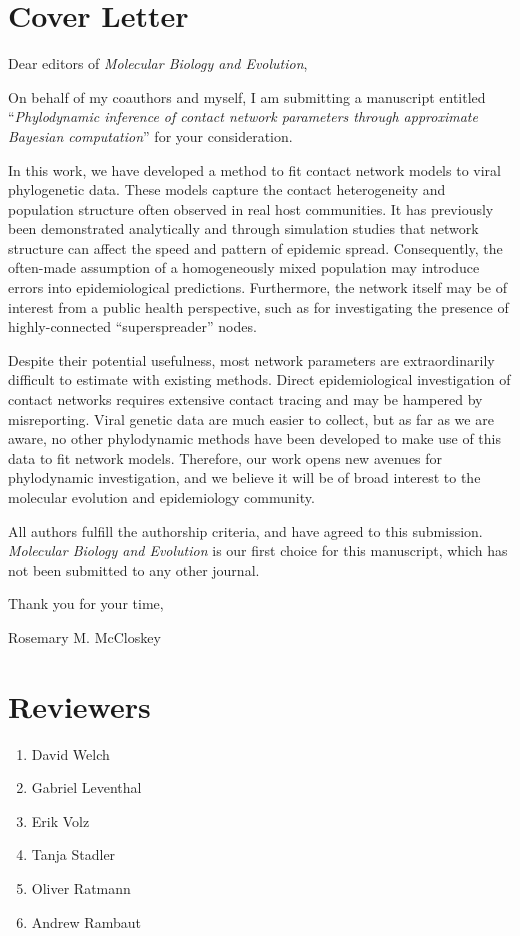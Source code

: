 \documentclass[12pt]{article}
\begin{document}
\section{Cover Letter}

Dear editors of \textit{Molecular Biology and Evolution},

On behalf of my coauthors and myself, I am submitting a manuscript entitled
``\textit{Phylodynamic inference of contact network parameters through
approximate Bayesian computation}'' for your consideration. 

In this work, we have developed a method to fit contact network models to viral
phylogenetic data. These models capture the contact heterogeneity and
population structure often observed in real host communities. It has previously
been demonstrated analytically and through simulation studies that network
structure can affect the speed and pattern of epidemic spread. Consequently,
the often-made assumption of a homogeneously mixed population may introduce
errors into epidemiological predictions. Furthermore, the network itself may be
of interest from a public health perspective, such as for investigating the
presence of highly-connected ``superspreader'' nodes.

Despite their potential usefulness, most network parameters are extraordinarily
difficult to estimate with existing methods. Direct epidemiological
investigation of contact networks requires extensive contact tracing and may be
hampered by misreporting. Viral genetic data are much easier to collect, but as
far as we are aware, no other phylodynamic methods have been developed to make
use of this data to fit network models. Therefore, our work opens new avenues
for phylodynamic investigation, and we believe it will be of broad interest to
the molecular evolution and epidemiology community.

All authors fulfill the authorship criteria, and have agreed to this
submission. \textit{Molecular Biology and Evolution} is our first choice for
this manuscript, which has not been submitted to any other journal.

Thank you for your time,

Rosemary M. McCloskey

\section{Reviewers}

\begin{enumerate}
  \item David Welch
  \item Gabriel Leventhal
  \item Erik Volz
  \item Tanja Stadler
  \item Oliver Ratmann
  \item Andrew Rambaut
\end{enumerate}
\end{document}
